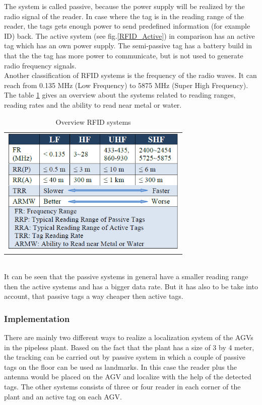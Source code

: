 The system is called passive, because the power supply will be realized by the radio signal of the reader. In case where the tag is in the reading range of the reader, the tags gets enough power to send predefined information (for example ID) back. The active system (see fig.\ref{RFID_Active}) in comparison has an active tag which has an own power supply. The semi-passive tag has a battery build in that the the tag has more power to communicate, but is not used to generate radio frequency signals.\\ 
Another classification of RFID systems is the frequency of the radio waves. It can reach from 0.135 MHz (Low Frequency) to 5875 MHz (Super High Frequency). The table \ref{RFID_Systems} gives an overview about the systems related to reading ranges, reading rates and the ability to read near metal or water.\\
\begin{table}[!htbp]
\centering
\begin{tabular}{c}
\includegraphics[width = 9cm]{Pictures/RFID_Systems}
\end{tabular}
\caption{Overview RFID systems}
\label{RFID_Systems}
\end{table}\\
It can be seen that the passive systems in general have a smaller reading range then the active systems and has a bigger data rate. But it has also to be take into account, that passive tags a way cheaper then active tags.   
\subsubsection*{Implementation}
There are mainly two different ways to realize a localization system of the AGVs in the pipeless plant. Based on the fact that the plant has a size of 3 by 4 meter, the tracking can be carried out by passive system in which a couple of passive tags on the floor can be used as landmarks. In this case the reader plus the antenna would be placed on the AGV and localize with the help of the detected tags. The other systems consists of three or four reader in each corner of the plant and an active tag on each AGV.
\pagebreak
